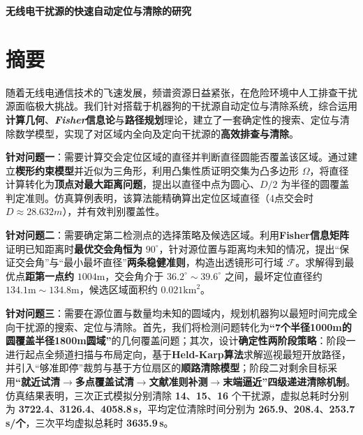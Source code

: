 \documentclass[UTF8, zihao=5,AutoFakeBold=2]{ctexart}
\begin{document}
\newpage

	{\centering
	{\bfseries 无线电干扰源的快速自动定位与清除的研究} \\[0.5cm]

	\section*{摘要}

	}

	随着无线电通信技术的飞速发展，频谱资源日益紧张，在危险环境中人工排查干扰源面临极大挑战。我们针对搭载于机器狗的干扰源自动定位与清除系统，综合运用\textbf{计算几何}、\textbf{\textit{Fisher}}\textbf{信息论}与\textbf{路径规划}理论，建立了一套确定性的搜索、定位与清除数学模型，实现了对区域内全向及定向干扰源的\textbf{高效排查与清除}。

\textbf{针对问题一}：需要计算交会定位区域的直径并判断直径圆能否覆盖该区域。通过建立\textbf{楔形约束模型}并近似为三角形，利用凸集性质证明交集为凸多边形 \(\Omega\)，将直径计算转化为\textbf{顶点对最大距离问题}，提出以直径中点为圆心、\(D/2\) 为半径的圆覆盖判定准则。仿真算例表明，该算法能精确算出定位区域直径（4点交会时 \textbf{\(D \approx 28.632m\)}），并有效判别覆盖性。

\textbf{针对问题二}：需要确定第二检测点的选择策略及候选区域。利用\textbf{Fisher信息矩阵}证明已知距离时\textbf{最优交会角恒为} \textbf{\(90^{\circ}\)}，针对源位置与距离均未知的情况，提出“保证交会角”与“最小最坏直径”\textbf{两条稳健准则}，构造出透镜形可行域 \(\mathcal{F}\)。求解得到最优点\textbf{距第一点约} \textbf{\(1004\text{m}\)}，交会角介于 \textbf{\(36.2^{\circ} \sim 39.6^{\circ}\)} 之间，最坏定位直径约 \textbf{\(134.1\text{m} \sim 134.8\text{m}\)}，候选区域面积约 \textbf{\(0.021\text{km}^2\)}。
  

\textbf{针对问题三}：需要在源位置与数量均未知的圆域内，规划机器狗以最短时间完成全向干扰源的搜索、定位与清除。首先，我们将检测问题转化为\textbf{“7个半径1000m的圆覆盖半径1800m圆域”}的几何覆盖问题；其次，设计\textbf{确定性两阶段策略}：阶段一进行起点全频道扫描与布局定向，基于\textbf{Held-Karp算法}求解巡视最短开放路径，并引入“够准即停”裁剪与基于方位扇区的\textbf{顺路清除模型}；阶段二对剩余目标采用\textbf{“就近试清\(\to\)多点覆盖试清\(\to\)文献准则补测\(\to\)末端逼近”四级递进清除机制}。仿真结果表明，三次正式模拟分别清除 \textbf{14}、\textbf{15}、\textbf{16} 个干扰源，虚拟总耗时分别为 \textbf{3722.4}、\textbf{3126.4}、\textbf{4058.8\,s}，平均定位清除时间分别为 \textbf{265.9}、\textbf{208.4}、\textbf{253.7\,s/个}，三次平均虚拟总耗时 \textbf{3635.9\,s}。
\end{document}

